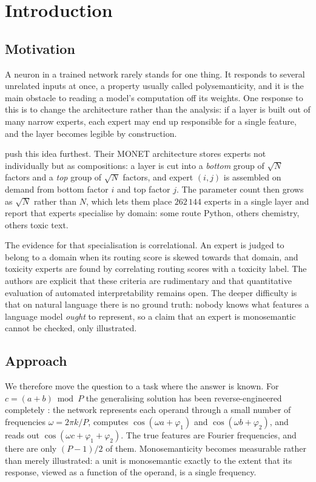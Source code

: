 \section{Introduction}

\subsection{Motivation}

A neuron in a trained network rarely stands for one thing. It responds to
several unrelated inputs at once, a property usually called polysemanticity,
and it is the main obstacle to reading a model's computation off its weights.
One response to this is to change the architecture rather than the analysis:
if a layer is built out of many narrow experts, each expert may end up
responsible for a single feature, and the layer becomes legible by
construction.

\citet{park2025monet} push this idea furthest. Their MONET architecture stores
experts not individually but as compositions: a layer is cut into a
\emph{bottom} group of $\sqrt{N}$ factors and a \emph{top} group of
$\sqrt{N}$ factors, and expert $(i,j)$ is assembled on demand from bottom
factor $i$ and top factor $j$. The parameter count then grows as $\sqrt{N}$
rather than $N$, which lets them place $262\,144$ experts in a single layer
and report that experts specialise by domain: some route Python, others
chemistry, others toxic text.

The evidence for that specialisation is correlational. An expert is judged to
belong to a domain when its routing score is skewed towards that domain, and
toxicity experts are found by correlating routing scores with a toxicity
label. The authors are explicit that these criteria are rudimentary and that
quantitative evaluation of automated interpretability remains open. The deeper
difficulty is that on natural language there is no ground truth: nobody knows
what features a language model \emph{ought} to represent, so a claim that an
expert is monosemantic cannot be checked, only illustrated.

\subsection{Approach}

We therefore move the question to a task where the answer is known. For
$c = (a + b) \bmod P$ the generalising solution has been reverse-engineered
completely \citep{nanda2023progress}: the network represents each operand
through a small number of frequencies $\omega = 2\pi k / P$, computes
$\cos(\omega a + \varphi_1)$ and $\cos(\omega b + \varphi_2)$, and reads out
$\cos(\omega c + \varphi_1 + \varphi_2)$. The true features are Fourier
frequencies, and there are only $(P-1)/2$ of them. Monosemanticity becomes
measurable rather than merely illustrated: a unit is monosemantic exactly to the
extent that its response, viewed as a function of the operand, is a single
frequency.

